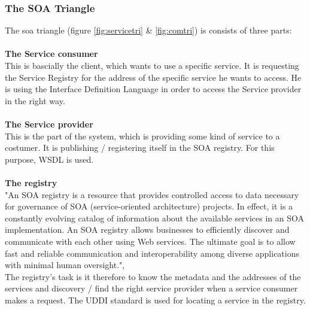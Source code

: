 \documentclass[12pt]{article}
\begin{document}
\subsubsection{The SOA Triangle}
\label{sec:soatriangle}
The \gls{soa} triangle (figure \ref{fig:servicetri} \& \ref{fig:comtri}) is consists of three parts:
\\\\\textbf{The Service consumer} \\
This is bascially the client, which wants to use a specific service. It is requesting the Service Registry 	for the address of the specific service he wants to access. He is using the Interface Definition Language in order to  access the Service provider in the right way.
\\\\\textbf{The Service provider}\\ 
This is the part of the system, which is providing some kind of service to a costumer. It is publishing / registering itself in the SOA registry. For this purpose, WSDL is used.
\\\\\textbf{The registry}\\ 
"An SOA registry is a resource that provides controlled access to data necessary for governance of SOA (service-oriented architecture) projects. In effect, it is a constantly evolving catalog of information about the available services in an SOA implementation. An SOA registry allows businesses to efficiently discover and communicate with each other using Web services. The ultimate goal is to allow fast and reliable communication and interoperability among diverse applications with minimal human oversight.", \cite{soareg}\\
The registry's task is it therefore to know the metadata and the addresses of the services and discovery / find the right service provider when a service consumer makes a request.
The UDDI standard is used for locating a service in the registry.
\end{document}
